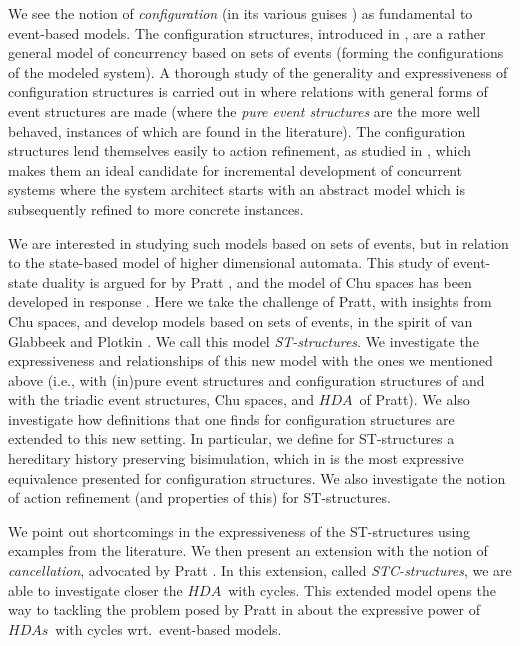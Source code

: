 \documentclass[submission,copyright,creativecommons]{eptcs}
\newcommand\HDA{\ensuremath{\mathit{HDA}}}
\newcommand\HDAs{\ensuremath{\mathit{HDAs}}}
\begin{document}
We see the notion of \textit{configuration} (in its various guises \cite{NielsenPW79eventstructures,GlabbeekP09configStruct,HoareMSW11CKA_foundationsJLAP}) as fundamental to event-based models.
The configuration structures, introduced in \cite{GlabbeekP95config}, are a rather general model of concurrency based on sets of events (forming the configurations of the modeled system). A thorough study of the generality and expressiveness of configuration structures is carried out in \cite{GlabbeekP09configStruct} where relations with general forms of event structures are made (where the \textit{pure event structures} are the more well behaved, instances of which are found in the literature).
The configuration structures lend themselves easily to action refinement, as studied in \cite{GlabbeekG01refinement}, which makes them an ideal candidate for incremental development of concurrent systems where the system architect starts with an abstract model which is subsequently refined to more concrete instances.

We are interested in studying such models based on sets of events, but in relation to the state-based model of higher dimensional automata. This study of event-state duality is argued for by Pratt \cite{Pratt02duality}, and the model of Chu spaces has been developed in response \cite{gupta94phd_chu,pratt95chu}. Here we take the challenge of Pratt, with insights from Chu spaces, and develop models based on sets of events, in the spirit of van Glabbeek and Plotkin \cite{GlabbeekP09configStruct}. We call this model \textit{ST-structures}. We investigate the expressiveness and relationships of this new model with the ones we mentioned above  (i.e., with (in)pure event structures and configuration structures of \cite{GlabbeekP09configStruct} and with the triadic event structures, Chu spaces, and \HDA\ of Pratt). 
We also investigate how definitions that one finds for configuration structures are extended to this new setting. 
In particular, we define for ST-structures a hereditary history preserving bisimulation, which in \cite{GlabbeekG01refinement} is the most expressive equivalence presented for configuration structures.
We also investigate the notion of action refinement (and properties of this) for ST-structures.  


We point out shortcomings in the expressiveness of the ST-structures using examples from the literature. We then present an extension with the notion of \textit{cancellation}, advocated by Pratt \cite{Pratt03trans_cancel}. In this extension, called \textit{STC-structures}, we are able to investigate closer the \HDA\ with cycles. This extended model opens the way to tackling the problem posed by Pratt in \cite{Pratt00HDArev} about the expressive power of \HDAs\ with cycles wrt.\ event-based models.
\end{document}
